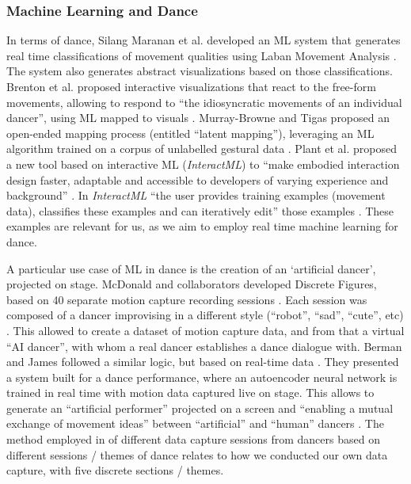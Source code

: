 \subsubsection{Machine Learning and Dance}

In terms of dance, Silang Maranan et al. developed an ML system that generates real time classifications of movement qualities using Laban Movement Analysis \cite{silang_maranan_designing_2014}. The system also generates abstract visualizations based on those classifications. Brenton et al. proposed interactive visualizations that react to the free-form movements, allowing to respond to “the idiosyncratic movements of an individual dancer”, using ML mapped to visuals \cite{brenton_embodied_2014}. Murray-Browne and Tigas proposed an open-ended mapping process (entitled “latent mapping”), leveraging an ML algorithm trained on a corpus of unlabelled gestural data \cite{murray-browne_latent_2021}. Plant et al. proposed a new tool based on interactive ML (\textit{InteractML}) to “make embodied interaction design faster, adaptable and accessible to developers of varying experience and background” \cite{plant_movement_2020}. In \textit{InteractML} “the user provides training examples (movement data), classifies these examples and can iteratively edit” those examples \cite{plant_interactive_2021}. These examples are relevant for us, as we aim to employ real time machine learning for dance.

A particular use case of ML in dance is the creation of an ‘artificial dancer’, projected on stage. McDonald and collaborators developed Discrete Figures, based on 40 separate motion capture recording sessions \cite{mcdonald_dance_2018}. Each session was composed of a dancer improvising in a different style (“robot”, “sad”, “cute”, etc) \cite{mcdonald_dance_2018}. This allowed to create a dataset of motion capture data, and from that a virtual “AI dancer”, with whom a real dancer establishes a dance dialogue with. Berman and James followed a similar logic, but based on real-time data \cite{berman_learning_2018}. They presented a system built for a dance performance, where an autoencoder neural network is trained in real time with motion data captured live on stage. This allows to generate an “artificial performer” projected on a screen and “enabling a mutual exchange of movement ideas” between “artificial” and “human” dancers \cite{berman_learning_2018}. The method employed in \cite{mcdonald_dance_2018} of different data capture sessions from dancers based on different sessions / themes of dance relates to how we conducted our own data capture, with five discrete sections / themes.

